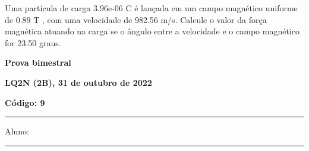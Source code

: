 \documentclass[12pt, addpoints]{exam}
\begin{document}
\begin{questions}
\begin{multicols*}{2}
\begin{oneparchoices}
\end{oneparchoices}
\question[20] Uma partícula de carga 3.96e-06 C é lançada em um campo magnético uniforme de    0.89 T , com uma velocidade de 982.56 m/s. Calcule o valor da força magnética atuando na carga se o ângulo entre a velocidade e o campo magnético for   23.50 graus.

\begin{oneparchoices}
\end{oneparchoices}
\end{multicols*}
\end{questions}
\newpage
        \begin{minipage}[b]{0.75\linewidth}
            \begin{flushleft}
                {\bf \large Prova bimestral}
            \end{flushleft}
            \begin{flushleft}
                {\bf \large LQ2N (2B), 31 de outubro de 2022}
            \end{flushleft}
        \end{minipage}
        \begin{minipage}[b]{0.20\linewidth}
            \begin{flushright}
                {\bf \large Código: 9}
            \end{flushright}
        \end{minipage}
        \vspace{0.5cm} \hrule \vspace{0.5cm}
        \begin{minipage}{0.75\linewidth}
            Aluno:
        \end{minipage}
        \vspace{0.5cm} \hrule \vspace{0.5cm}
\end{document}
